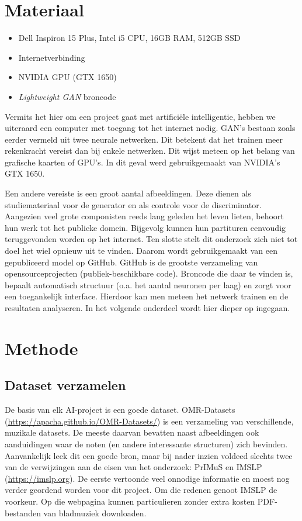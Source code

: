 \documentclass[dutch, twoside, a4paper, 10pt]{article}
\begin{document}
\section{Materiaal}

\begin{itemize}
\setlength{\itemsep}{1pt}
\item Dell Inspiron 15 Plus, Intel i5 CPU, 16GB RAM, 512GB SSD
\item Internetverbinding
\item NVIDIA GPU (GTX 1650)
\item \textit{Lightweight GAN} broncode
\end{itemize}
Vermits het hier om een project gaat met artificiële intelligentie, hebben we uiteraard een computer met toegang tot het internet nodig. GAN's bestaan zoals eerder vermeld uit twee neurale netwerken. Dit betekent dat het trainen meer rekenkracht vereist dan bij enkele netwerken. Dit wijst meteen op het belang van grafische kaarten of GPU's. In dit geval werd gebruikgemaakt van NVIDIA's GTX 1650. \par\bigskip\noindent
Een andere vereiste is een groot aantal afbeeldingen. Deze dienen als studiemateriaal voor de generator en als controle voor de discriminator. Aangezien veel grote componisten reeds lang geleden het leven lieten, behoort hun werk tot het publieke domein. Bijgevolg kunnen hun partituren eenvoudig teruggevonden worden op het internet. Ten slotte stelt dit onderzoek zich niet tot doel het wiel opnieuw uit te vinden. Daarom wordt gebruikgemaakt van een gepubliceerd model op GitHub. GitHub is de grootste verzameling van opensourceprojecten (publiek-beschikbare code).  Broncode die daar te vinden is, bepaalt automatisch structuur (o.a. het aantal neuronen per laag) en zorgt voor een toegankelijk interface. Hierdoor kan men meteen het netwerk trainen en de resultaten analyseren. In het volgende onderdeel wordt hier dieper op ingegaan.

\section{Methode}
\subsection{Dataset verzamelen}
De basis van elk AI-project is een goede dataset. OMR-Datasets (\url{https://apacha.github.io/OMR-Datasets/}) is een verzameling van verschillende, muzikale datasets. De meeste daarvan bevatten naast afbeeldingen ook aanduidingen waar de noten (en andere interessante structuren) zich bevinden. Aanvankelijk leek dit een goede bron, maar bij nader inzien voldeed slechts twee van de verwijzingen aan de eisen van het onderzoek: PrIMuS en IMSLP (\url{https://imslp.org}). De eerste vertoonde veel onnodige informatie en moest nog verder geordend worden voor dit project. Om die redenen genoot IMSLP de voorkeur. Op die webpagina kunnen particulieren zonder extra kosten PDF-bestanden van bladmuziek downloaden. 
\end{document}
